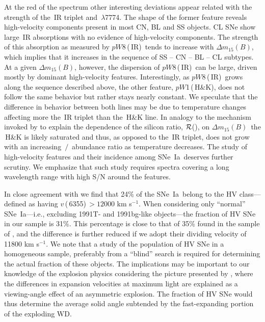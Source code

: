 \documentclass[apj]{emulateapj-rtx4}
\newcommand{\pwone}{$pW$1\,(\ion{Ca}{2}\,H\&K)}
\newcommand{\pweight}{$pW$8\,(\ion{Ca}{2}\,IR)}
\newcommand{\vsix}{$v$\,(\ion{Si}{2}\,6355)}
\newcommand{\dm}{$\Delta m_{15}(B)$}
\newcommand{\rsi}{$\cal{R}$(\ion{Si}{2})}
\newcommand{\sneia}{SNe~Ia}
\begin{document}
At the red of the spectrum other interesting deviations appear related
with the strength of the \,IR triplet and
\,$\lambda$7774. The shape of the former feature reveals
high-velocity components present in most CN, BL and SS objects. CL SNe
show large \,IR absorptions with no evidence of high-velocity
components. The strength of this absorption as measured by
\pweight\ tends to increase with \dm, which implies 
that it increases in the sequence of SS -- CN -- BL -- CL subtypes. At
a given \dm, however, the dispersion of \pweight\ can be large, driven
mostly by dominant high-velocity features. Interestingly, as
\pweight\ grows along the sequence described above, the other
 feature, \pwone, does not follow the same behavior but
rather stays nearly constant. We speculate that the difference in behavior
between both  lines may be due to temperature changes
affecting more the \,IR triplet than the \,H\&K
line. In analogy to the mechanism invoked by \citet{hachinger08}
to explain the dependence of the silicon ratio, \rsi, on \dm\, the
  \,H\&K is likely saturated and thus, as opposed to the
  \,IR triplet, does not grow with an increasing
  \,$/$\, abundance ratio as temperature
  decreases. The study of 
high-velocity features and their incidence among 
\sneia\ deserves further scrutiny. We emphasize that such study
requires spectra covering a long wavelength range with high S/N
around the  features.

In close agreement with \citet{blondin12} we find that 24\% of the
\sneia\ belong to the HV class---defined as having \vsix\,$>12000$ km
s$^{-1}$. When considering only ``normal'' \sneia---i.e., excluding
1991T- and 1991bg-like objects---the fraction of HV SNe in our sample
is 31\%. This percentage is close to that
of 35\% found in the sample of \citet{wang09}, and the difference
is further reduced if we adopt their dividing velocity of 11800 km
s$^{-1}$. We note that a study of the population of HV SNe in a
homogeneous sample, preferably from a ``blind'' search is required for
determining the actual fraction of these objects. The implications may
be important to our 
knowledge of the explosion physics considering the picture presented by
\citet{maeda10b}, where the differences in expansion velocities at
maximum light are explained as a viewing-angle effect of an asymmetric
explosion. The fraction of HV SNe would thus determine the average
solid angle subtended by the fast-expanding portion of the exploding WD.
 
\end{document}
